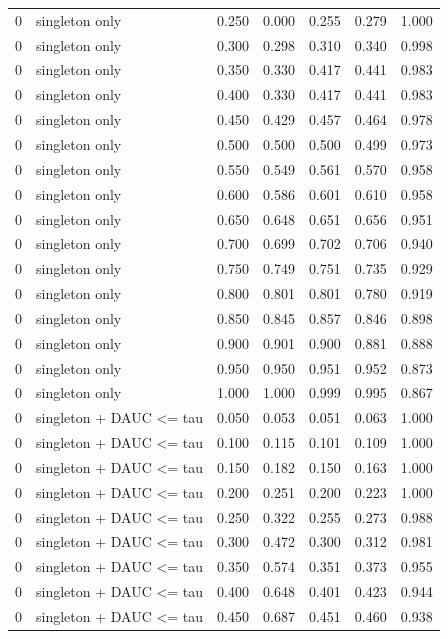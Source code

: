 \begin{tabular}{rlrrrrr}
0 & singleton only & 0.250 & 0.000 & 0.255 & 0.279 & 1.000 \\
0 & singleton only & 0.300 & 0.298 & 0.310 & 0.340 & 0.998 \\
0 & singleton only & 0.350 & 0.330 & 0.417 & 0.441 & 0.983 \\
0 & singleton only & 0.400 & 0.330 & 0.417 & 0.441 & 0.983 \\
0 & singleton only & 0.450 & 0.429 & 0.457 & 0.464 & 0.978 \\
0 & singleton only & 0.500 & 0.500 & 0.500 & 0.499 & 0.973 \\
0 & singleton only & 0.550 & 0.549 & 0.561 & 0.570 & 0.958 \\
0 & singleton only & 0.600 & 0.586 & 0.601 & 0.610 & 0.958 \\
0 & singleton only & 0.650 & 0.648 & 0.651 & 0.656 & 0.951 \\
0 & singleton only & 0.700 & 0.699 & 0.702 & 0.706 & 0.940 \\
0 & singleton only & 0.750 & 0.749 & 0.751 & 0.735 & 0.929 \\
0 & singleton only & 0.800 & 0.801 & 0.801 & 0.780 & 0.919 \\
0 & singleton only & 0.850 & 0.845 & 0.857 & 0.846 & 0.898 \\
0 & singleton only & 0.900 & 0.901 & 0.900 & 0.881 & 0.888 \\
0 & singleton only & 0.950 & 0.950 & 0.951 & 0.952 & 0.873 \\
0 & singleton only & 1.000 & 1.000 & 0.999 & 0.995 & 0.867 \\
0 & singleton + DAUC <= tau & 0.050 & 0.053 & 0.051 & 0.063 & 1.000 \\
0 & singleton + DAUC <= tau & 0.100 & 0.115 & 0.101 & 0.109 & 1.000 \\
0 & singleton + DAUC <= tau & 0.150 & 0.182 & 0.150 & 0.163 & 1.000 \\
0 & singleton + DAUC <= tau & 0.200 & 0.251 & 0.200 & 0.223 & 1.000 \\
0 & singleton + DAUC <= tau & 0.250 & 0.322 & 0.255 & 0.273 & 0.988 \\
0 & singleton + DAUC <= tau & 0.300 & 0.472 & 0.300 & 0.312 & 0.981 \\
0 & singleton + DAUC <= tau & 0.350 & 0.574 & 0.351 & 0.373 & 0.955 \\
0 & singleton + DAUC <= tau & 0.400 & 0.648 & 0.401 & 0.423 & 0.944 \\
0 & singleton + DAUC <= tau & 0.450 & 0.687 & 0.451 & 0.460 & 0.938 \\

\end{tabular}
